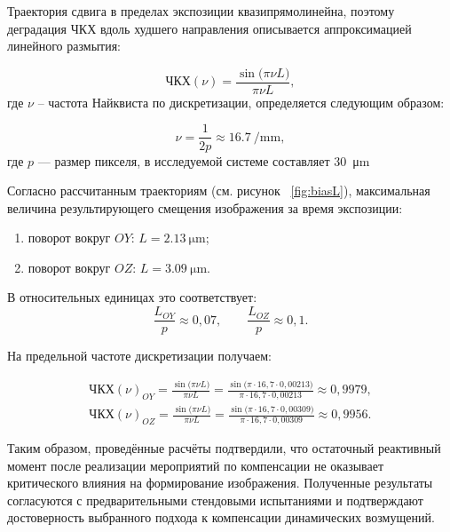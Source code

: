  Траектория сдвига в пределах экспозиции квазипрямолинейна, поэтому деградация ЧКХ вдоль худшего направления описывается аппроксимацией линейного размытия:
 
 \begin{equation}
 	\label{eq:MTF_aprox}
 	\text{ЧКХ}(\nu) = \frac{\sin\!\bigl(\pi \nu L\bigr)}{\pi \nu L},
 \end{equation}
 где \(\nu\) -- частота Найквиста по дискретизации, определяется следующим образом:
 
 \begin{equation}
 	\label{eq:nykvist}
 	\nu = \frac{1}{2p} \approx \SI{16.7}{\per\milli\meter},
 \end{equation}
 где \(p\) --- размер пикселя, в исследуемой системе составляет \SI{30}{\micro\meter}
 
 Согласно рассчитанным траекториям (см. рисунок ~\ref{fig:biasL}), максимальная величина результирующего смещения изображения за время экспозиции:
\begin{samepage}
 \begin{enumerate}
	\item поворот вокруг $OY$: $L= \SI{2,13}{\micro\meter}$;
	\item поворот вокруг $OZ$: $L= \SI{3,09}{\micro\meter}$.
\end{enumerate}
\end{samepage}

 
 В относительных единицах это соответствует:
 \begin{equation}
 	\frac{L_{OY}}{p} \approx 0,07, \quad \quad \frac{L_{OZ}}{p} \approx 0,1.
 \end{equation}
 
 На предельной частоте дискретизации получаем:
 
 \begin{equation}
 	\begin{split}
 		\label{eq:MTF_result}
 		\text{ЧКХ}(\nu)_{OY}=\frac{\sin\!\bigl(\pi \nu L\bigr)}{\pi \nu L} =  \frac{\sin\!\bigl(\pi \cdot 16,7 \cdot 0,00213 \bigr)}{\pi \cdot 16,7 \cdot 0,00213} \approx  0,9979,\\
 		\text{ЧКХ}(\nu)_{OZ}=\frac{\sin\!\bigl(\pi \nu L\bigr)}{\pi \nu L} =  \frac{\sin\!\bigl(\pi \cdot 16,7 \cdot 0,00309 \bigr)}{\pi \cdot 16,7 \cdot 0,00309} \approx 0,9956.
 	\end{split}
 \end{equation}
 
Таким образом, проведённые расчёты подтвердили, что остаточный реактивный момент после реализации мероприятий по компенсации не оказывает критического влияния на формирование изображения. Полученные результаты согласуются с предварительными стендовыми испытаниями и подтверждают достоверность выбранного подхода к компенсации динамических возмущений.
 
